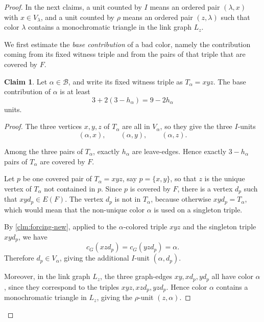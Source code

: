 \documentclass[10pt,a4paper]{article}
\theoremstyle{definition}
\newtheorem{claim}[theorem]{Claim}
\newcommand{\cB}{\mathcal{B}}
\begin{document}
\begin{proof}
    In the next claims, a unit counted by \(I\) means an ordered pair
    \((\lambda,x)\) with \(x\in V_\lambda\), and a unit counted by \(\rho\)
    means an ordered pair \((z,\lambda)\) such that color \(\lambda\)
    contains a monochromatic triangle in the link graph \(L_z\).

    We first estimate the {\it base contribution} of a bad color, namely the
    contribution coming from its fixed witness triple and from the pairs of
    that triple that are covered by \(F\).


    \begin{claim}\label{clm:bad-base-new}
        Let $\alpha\in\cB$, and write its fixed witness triple as $T_\alpha=xyz$.
        The base contribution of
        $\alpha$ is at least
        \begin{equation}\label{eq:bad-base-new}
            3+2(3-h_\alpha)=9-2h_\alpha
        \end{equation}
        units.
    \end{claim}

    \begin{proof}
        The three vertices $x,y,z$ of $T_\alpha$ are all in $V_\alpha$, so
        they give the three $I$-units
        \[
            (\alpha,x),\qquad (\alpha,y),\qquad (\alpha,z).
        \]


        Among the three pairs of $T_\alpha$, exactly $h_\alpha$ are
        leave-edges.  Hence exactly $3-h_\alpha$ pairs of $T_\alpha$ are
        covered by $F$.

        Let $p$ be one covered pair of $T_\alpha=xyz$, say $p=\{x,y\}$, so that $z$ is the unique vertex of $T_\alpha$ not contained in $p$.
        Since $p$ is covered by $F$, there is a vertex $d_p$ such that $xyd_p\in E(F)$.
        The vertex $d_p$ is not in $T_\alpha$, because otherwise
        $xyd_p=T_\alpha$, which would mean that the non-unique color $\alpha$
        is used on a singleton triple.

        By \cref{clm:forcing-new}, applied to the $\alpha$-colored triple
        $xyz$ and the singleton triple $xyd_p$, we have
        \[
            c_G(xzd_p)=c_G(yzd_p)=\alpha.
        \]
        Therefore $d_p\in V_\alpha$, giving the additional $I$-unit $(\alpha,d_p)$.

        Moreover, in the link graph $L_z$, the three graph-edges $xy, xd_p,yd_p$ all have color $\alpha$, since they correspond to the triples
        $xyz,xzd_p,yzd_p$.
        Hence color $\alpha$ contains a monochromatic
        triangle in $L_z$, giving the $\rho$-unit $(z,\alpha)$.


\end{proof}
\end{proof}
\end{document}
